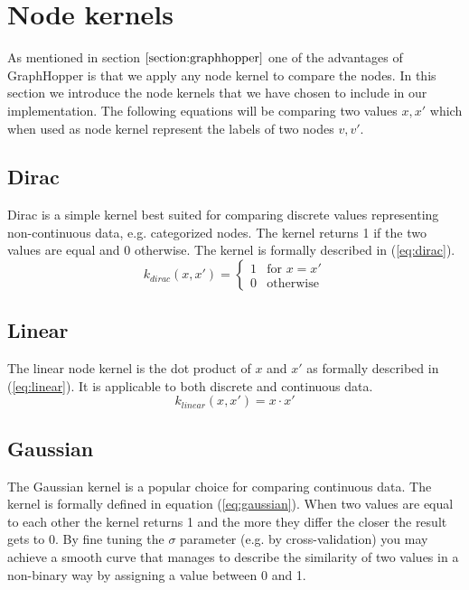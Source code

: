 \documentclass{article}
\begin{document}
\section{Node kernels}
\label{section:node-kernels}
As mentioned in section $\ref{section:graphhopper}$ one of the advantages of GraphHopper is that we apply any node kernel to compare the nodes. In this section we introduce the node kernels that we have chosen to include in our implementation. The following equations will be comparing two values $x,x'$ which when used as node kernel represent the labels of two nodes $v,v'$.

\subsection{Dirac}
Dirac is a simple kernel best suited for comparing discrete values representing non-continuous data, e.g. categorized nodes. The kernel returns 1 if the two values are equal and 0 otherwise. The kernel is formally described in (\ref{eq:dirac}).
\begin{equation}
\label{eq:dirac}
k_{dirac}(x, x')=\begin{cases}
1 & \text{for }x=x'\\
0 & \text{otherwise}
\end{cases}
\end{equation}

\subsection{Linear}
The linear node kernel is the dot product of $x$ and $x'$ as formally described in (\ref{eq:linear}). It is applicable to both discrete and continuous data.
\begin{equation}
\label{eq:linear}
k_{linear}(x, x') = x \cdot x'
\end{equation}

\subsection{Gaussian}
The Gaussian kernel is a popular choice for comparing continuous data. The kernel is formally defined in equation (\ref{eq:gaussian}). When two values are equal to each other the kernel returns 1 and the more they differ the closer the result gets to 0. By fine tuning the $\sigma$ parameter (e.g. by cross-validation) you may achieve a smooth curve that manages to describe the similarity of two values in a non-binary way by assigning a value between 0 and 1.
\end{document}
